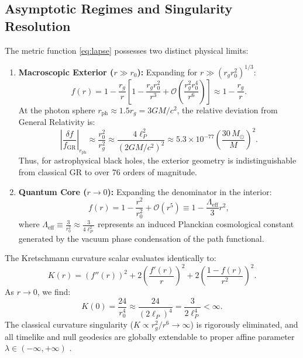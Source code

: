 \documentclass[11pt,a4paper]{article}
\begin{document}
\subsection{Asymptotic Regimes and Singularity Resolution}
The metric function \eqref{eq:lapse} possesses two distinct physical limits:
\begin{enumerate}
    \item \textbf{Macroscopic Exterior ($r \gg r_0$):} Expanding for $r \gg (r_g r_0^2)^{1/3}$:
    \begin{equation}
    f(r) = 1 - \frac{r_g}{r} \left[ 1 - \frac{r_g r_0^2}{r^3} + \mathcal{O}\left(\frac{r_g^2 r_0^4}{r^6}\right) \right] \approx 1 - \frac{r_g}{r}.
    \end{equation}
    At the photon sphere $r_{\mathrm{ph}} \approx 1.5 r_g = 3GM/c^2$, the relative deviation from General Relativity is:
    \begin{equation}
    \left| \frac{\delta f}{f_{\mathrm{GR}}} \right|_{r_{\mathrm{ph}}} \approx \frac{r_0^2}{r_g^2} \approx \frac{4 \ell_P^2}{(2 G M / c^2)^2} \approx 5.3 \times 10^{-77} \left( \frac{30\,M_\odot}{M} \right)^2.
    \end{equation}
    Thus, for astrophysical black holes, the exterior geometry is indistinguishable from classical GR to over 76 orders of magnitude.
    
    \item \textbf{Quantum Core ($r \to 0$):} Expanding the denominator in the interior:
    \begin{equation}
    f(r) = 1 - \frac{r^2}{r_0^2} + \mathcal{O}(r^5) \equiv 1 - \frac{\Lambda_{\mathrm{eff}}}{3} r^2,
    \end{equation}
    where $\Lambda_{\mathrm{eff}} \equiv \frac{3}{r_0^2} \approx \frac{3}{4\ell_P^2}$ represents an induced Planckian cosmological constant generated by the vacuum phase condensation of the path functional.
\end{enumerate}

The Kretschmann curvature scalar evaluates identically to:
\begin{equation}
K(r) = (f''(r))^2 + 2 \left( \frac{f'(r)}{r} \right)^2 + 2 \left( \frac{1 - f(r)}{r^2} \right)^2.
\end{equation}
As $r \to 0$, we find:
\begin{equation}
K(0) = \frac{24}{r_0^4} \approx \frac{24}{(2\ell_P)^4} = \frac{3}{2 \ell_P^4} < \infty.
\end{equation}
The classical curvature singularity ($K \propto r_g^2 / r^6 \to \infty$) is rigorously eliminated, and all timelike and null geodesics are globally extendable to proper affine parameter $\lambda \in (-\infty, +\infty)$ \cite{Pavliuk2026b}.
\end{document}
